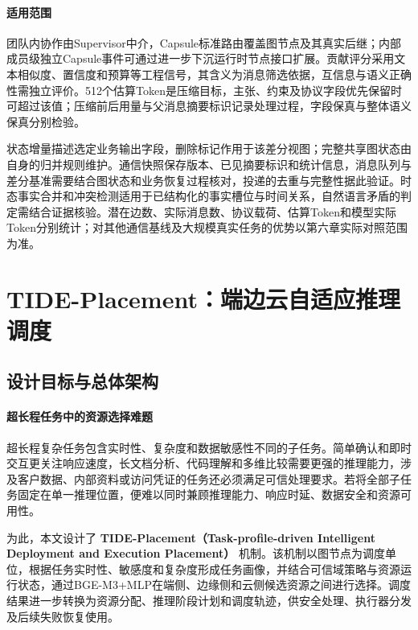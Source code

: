 

\paragraph{适用范围}
团队内协作由Supervisor中介，Capsule标准路由覆盖图节点及其真实后继；内部成员级独立Capsule事件可通过进一步下沉运行时节点接口扩展。贡献评分采用文本相似度、置信度和预算等工程信号，其含义为消息筛选依据，互信息与语义正确性需独立评价。512个估算Token是压缩目标，主张、约束及协议字段优先保留时可超过该值；压缩前后用量与父消息摘要标识记录处理过程，字段保真与整体语义保真分别检验。

状态增量描述选定业务输出字段，删除标记作用于该差分视图；完整共享图状态由自身的归并规则维护。通信快照保存版本、已见摘要标识和统计信息，消息队列与差分基准需要结合图状态和业务恢复过程核对，投递的去重与完整性据此验证。时态事实合并和冲突检测适用于已结构化的事实槽位与时间关系，自然语言矛盾的判定需结合证据核验。潜在边数、实际消息数、协议载荷、估算Token和模型实际Token分别统计；对其他通信基线及大规模真实任务的优势以第六章实际对照范围为准。

\section{TIDE-Placement：端边云自适应推理调度}
\label{sec:tide_placement}

\subsection{设计目标与总体架构}

\paragraph{超长程任务中的资源选择难题}

超长程复杂任务包含实时性、复杂度和数据敏感性不同的子任务。简单确认和即时交互更关注响应速度，长文档分析、代码理解和多维比较需要更强的推理能力，涉及客户数据、内部资料或访问凭证的任务还必须满足可信处理要求。若将全部子任务固定在单一推理位置，便难以同时兼顾推理能力、响应时延、数据安全和资源可用性。

为此，本文设计了
\textbf{TIDE-Placement（Task-profile-driven Intelligent Deployment and Execution Placement）}
机制。该机制以图节点为调度单位，根据任务实时性、敏感度和复杂度形成任务画像，并结合可信域策略与资源运行状态，通过BGE-M3+MLP在端侧、边缘侧和云侧候选资源之间进行选择。调度结果进一步转换为资源分配、推理阶段计划和调度轨迹，供安全处理、执行器分发及后续失败恢复使用。

